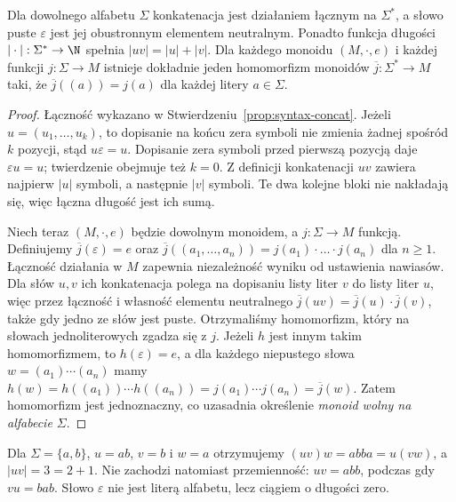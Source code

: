 \begin{twierdzenie}\label{thm:syntax-free-monoid-xlv}
Dla dowolnego alfabetu $\Sigma$ konkatenacja jest działaniem
łącznym na $\Sigma^*$, a słowo puste $\varepsilon$ jest jej
obustronnym elementem neutralnym. Ponadto funkcja długości
$|\cdot|:\Sigma^*\to\N$ spełnia $|uv|=|u|+|v|$.
Dla każdego monoidu $(M,\cdot,e)$ i każdej funkcji
$j:\Sigma\to M$ istnieje dokładnie jeden homomorfizm monoidów
$\overline j:\Sigma^*\to M$ taki, że
$\overline j((a))=j(a)$ dla każdej litery $a\in\Sigma$.
\end{twierdzenie}
\begin{proof}
Łączność wykazano w Stwierdzeniu~\ref{prop:syntax-concat}.
Jeżeli $u=(u_1,\ldots,u_k)$, to dopisanie na końcu zera symboli
nie zmienia żadnej spośród $k$ pozycji, stąd $u\varepsilon=u$.
Dopisanie zera symboli przed pierwszą pozycją daje
$\varepsilon u=u$; twierdzenie obejmuje też $k=0$.
Z definicji konkatenacji $uv$ zawiera najpierw $|u|$ symboli,
a następnie $|v|$ symboli. Te dwa kolejne bloki nie
nakładają się, więc łączna długość jest ich sumą.

Niech teraz $(M,\cdot,e)$ będzie dowolnym monoidem, a
$j:\Sigma\to M$ funkcją. Definiujemy
$\overline j(\varepsilon)=e$ oraz
$\overline j((a_1,\ldots,a_n))=
 j(a_1)\cdot\ldots\cdot j(a_n)$ dla $n\geq1$.
Łączność działania w $M$ zapewnia niezależność wyniku
od ustawienia nawiasów. Dla słów $u,v$ ich konkatenacja
polega na dopisaniu listy liter $v$ do listy liter $u$,
więc przez łączność i własność elementu neutralnego
$\overline j(uv)=\overline j(u)\cdot\overline j(v)$,
także gdy jedno ze słów jest puste.
Otrzymaliśmy homomorfizm, który na słowach jednoliterowych
zgadza się z $j$.
Jeżeli $h$ jest innym takim homomorfizmem, to
$h(\varepsilon)=e$, a dla każdego niepustego słowa
$w=(a_1)\cdots(a_n)$ mamy
$h(w)=h((a_1))\cdots h((a_n))
=j(a_1)\cdots j(a_n)=\overline j(w)$.
Zatem homomorfizm jest jednoznaczny, co uzasadnia
określenie \emph{monoid wolny na alfabecie $\Sigma$}.
\end{proof}
\begin{przyklad}
Dla $\Sigma=\{a,b\}$, $u=ab$, $v=b$ i $w=a$ otrzymujemy
$(uv)w=abba=u(vw)$, a $|uv|=3=2+1$.
Nie zachodzi natomiast przemienność: $uv=abb$, podczas
gdy $vu=bab$. Słowo $\varepsilon$ nie jest literą alfabetu,
lecz ciągiem o długości zero.
\end{przyklad}

